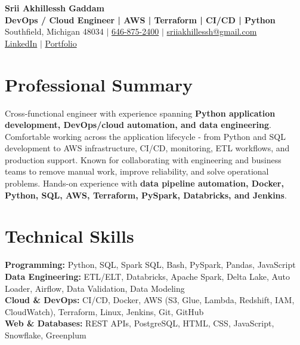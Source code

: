 \documentclass[letterpaper,10pt]{article}
\begin{document}
\fontsize{9.35pt}{10.45pt}\selectfont

\begin{center}
    {\LARGE \textbf{Srii Akhillessh Gaddam}} \\[-1pt]
    \textbf{DevOps / Cloud Engineer | AWS | Terraform | CI/CD | Python} \\[2pt]
    Southfield, Michigan 48034 $|$
    \href{tel:6468752400}{646-875-2400} $|$
    \href{mailto:sriiakhillessh@gmail.com}{sriiakhillessh@gmail.com} \\[1pt]
    \href{https://www.linkedin.com/in/srii-akhiilessh-gaddam-b48668191/}{LinkedIn} $|$
    \href{https://sriiakhillesshg.github.io/portfolio/}{Portfolio}
\end{center}
\vspace{-8pt}

\section{Professional Summary}
\small{Cross-functional engineer with experience spanning \textbf{Python application development, DevOps/cloud automation, and data engineering}. Comfortable working across the application lifecycle - from Python and SQL development to AWS infrastructure, CI/CD, monitoring, ETL workflows, and production support. Known for collaborating with engineering and business teams to remove manual work, improve reliability, and solve operational problems. Hands-on experience with \textbf{data pipeline automation, Docker, Python, SQL, AWS, Terraform, PySpark, Databricks, and Jenkins}.}

\section{Technical Skills}
\small{
\textbf{Programming:} Python, SQL, Spark SQL, Bash, PySpark, Pandas, JavaScript \\
\textbf{Data Engineering:} ETL/ELT, Databricks, Apache Spark, Delta Lake, Auto Loader, Airflow, Data Validation, Data Modeling \\
\textbf{Cloud \& DevOps:} CI/CD, Docker, AWS (S3, Glue, Lambda, Redshift, IAM, CloudWatch), Terraform, Linux, Jenkins, Git, GitHub \\
\textbf{Web \& Databases:} REST APIs, PostgreSQL, HTML, CSS, JavaScript, Snowflake, Greenplum
}
\end{document}
